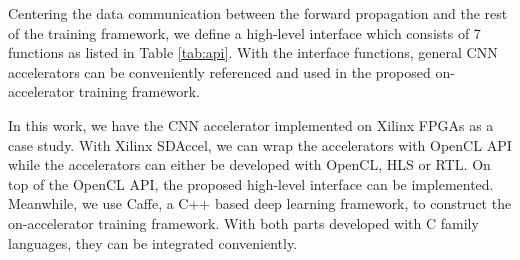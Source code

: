 Centering the data communication between the forward propagation 
and the rest of the training framework, we define a high-level 
interface which consists of 7 functions as listed in Table \ref{tab:api}. 
With the interface functions, general CNN accelerators can be conveniently 
referenced and used in the proposed on-accelerator training framework. 

In this work, we have the CNN accelerator implemented on Xilinx FPGAs as a case study. 
With Xilinx SDAccel, we can wrap the accelerators with OpenCL API while the accelerators 
can either be developed with OpenCL, HLS or RTL. On top of the OpenCL API, the proposed 
high-level interface can be implemented. Meanwhile, we use Caffe, a C++ based 
deep learning framework, to construct the on-accelerator training framework. With 
both parts developed with C family languages, they can be integrated conveniently. 



